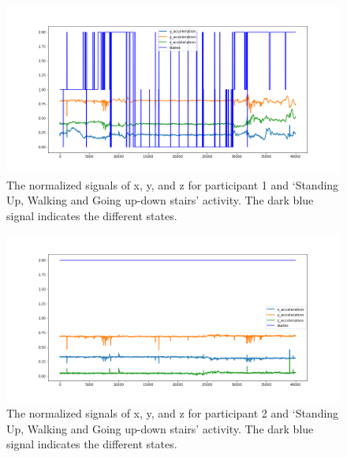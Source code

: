\begin{figure}[H]
    \centering
    \begin{minipage}[b]{1\textwidth}
        \includegraphics[width=\textwidth]{manuscript/src/figures/Ass3/Ass3_Q2_states_user_0N.png}
    \end{minipage}
    \caption{The normalized signals of x, y, and z for participant 1 and ‘Standing  Up,  Walking  and  Going  up-down  stairs’ activity. The dark blue signal indicates the different states.}
    \label{fig:Ass3_Q2_states_user_0N}
\end{figure}
\begin{figure}[H]
    \centering
    \begin{minipage}[b]{1\textwidth}
        \includegraphics[width=\textwidth]{manuscript/src/figures/Ass3/Ass3_Q2_states_user_1N.png}
    \end{minipage}
    \caption{The normalized signals of x, y, and z for participant 2 and ‘Standing  Up,  Walking  and  Going  up-down  stairs’ activity. The dark blue signal indicates the different states.}
    \label{fig:Ass3_Q2_states_user_1N}
\end{figure}
